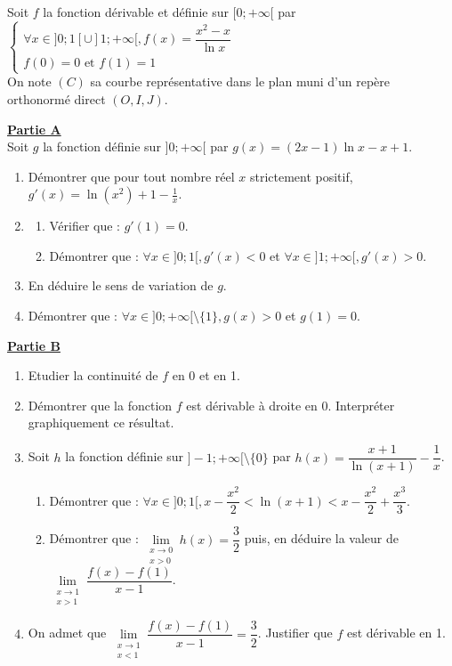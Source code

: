 \documentclass[12pt,a4paper]{article}
\begin{document}
\vspace{0.3cm}

\noindent Soit $f$ la fonction dérivable et définie sur $[0; +\infty[$ par 
$\begin{cases} \forall x \in ]0; 1[ \cup ]1; +\infty[, f(x) = \dfrac{x^2 - x}{\ln x} \\ f(0) = 0 \text{ et } f(1) = 1 \end{cases}$ \\
On note $(C)$ sa courbe représentative dans le plan muni d'un repère orthonormé direct $(O, I, J)$.

\vspace{0.5cm}

\noindent \underline{\textbf{Partie A}} \\
Soit $g$ la fonction définie sur $]0; +\infty[$ par $g(x) = (2x - 1)\ln x - x + 1$.
\begin{enumerate}
    \item Démontrer que pour tout nombre réel $x$ strictement positif, $g'(x) = \ln ( x^{2} )+ 1 - \frac{1}{x}$.
    \item \begin{enumerate}
        \item Vérifier que : $g'(1) = 0$.
        \item Démontrer que : $\forall x \in ]0; 1[, g'(x) < 0$ et $\forall x \in ]1; +\infty[, g'(x) > 0$.
    \end{enumerate}
    \item En déduire le sens de variation de $g$.
    \item Démontrer que : $\forall x \in ]0; +\infty[ \setminus \{1\}, g(x) > 0$ et $g(1) = 0$.
\end{enumerate}

\vspace{0.5cm}

\noindent \underline{\textbf{Partie B}} \\
\begin{enumerate}
    \item Etudier la continuité de $f$ en 0 et en 1.
    \item Démontrer que la fonction $f$ est dérivable à droite en 0. Interpréter graphiquement ce résultat.
    \item Soit $h$ la fonction définie sur $]-1; +\infty[ \setminus \{0\}$ par $h(x) = \dfrac{x+1}{\ln(x+1)} - \dfrac{1}{x}$.
    \begin{enumerate}
        \item Démontrer que : $\forall x \in ]0; 1[, x - \dfrac{x^2}{2} < \ln(x+1) < x - \dfrac{x^2}{2} + \dfrac{x^3}{3}$.
        \item Démontrer que : $\lim\limits_{\substack{x \to 0 \\ x > 0}} h(x) = \dfrac{3}{2}$ puis, en déduire la valeur de $\lim\limits_{\substack{x \to 1 \\ x > 1}} \dfrac{f(x) - f(1)}{x - 1}$.
    \end{enumerate}
    \item On admet que $\lim\limits_{\substack{x \to 1 \\ x < 1}} \dfrac{f(x) - f(1)}{x - 1} = \dfrac{3}{2}$. Justifier que $f$ est dérivable en 1.
\end{enumerate}
\end{document}
